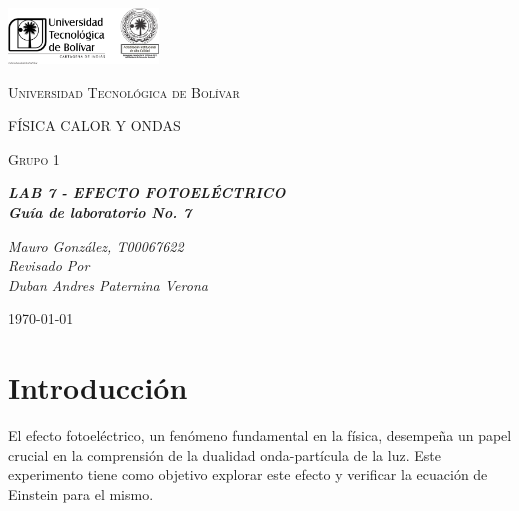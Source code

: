 \documentclass[twocolumn, 12pt]{article}
\begin{document}
\begin{titlepage}
      \centering
      \includegraphics[width=0.3\textwidth]{Images/logo_utb.png}\par\vspace{1cm}
      {\scshape\LARGE Universidad Tecnológica de Bolívar \par}
      \vspace{1cm}

      {\scshape\Large FÍSICA CALOR Y ONDAS \par}
      \vspace{.2cm}

      {\scshape\Large Grupo 1 \par}
      \vspace{2cm}
      \slshape {\Large \bfseries{}LAB 7 - EFECTO FOTOELÉCTRICO\\}
      \slshape {\small \bfseries{} Guía de laboratorio No. 7}
      \vspace{4cm}

      \slshape {\itshape{} Mauro González, T00067622 \\}
      \vfill
      Revisado Por \\
      Duban Andres Paternina Verona\\
      {\large \today\par}
\end{titlepage}

\section{Introducción}

El efecto fotoeléctrico, un fenómeno fundamental en la
física, desempeña un papel crucial en la comprensión de la
dualidad onda-partícula de la luz. Este experimento tiene
como objetivo explorar este efecto y verificar la ecuación
de Einstein para el mismo.
\end{document}
